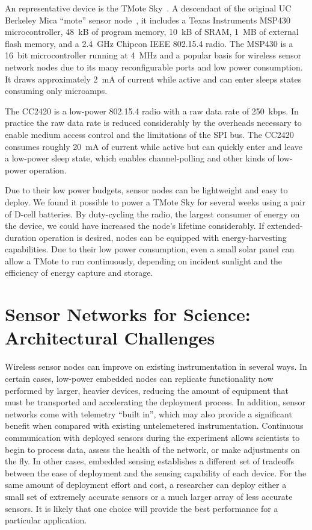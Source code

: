 An representative device is the TMote Sky~\cite{moteiv}. A descendant of the
original UC Berkeley Mica ``mote'' sensor node~\cite{hill-thesis}, it
includes a Texas Instruments MSP430 microcontroller, 48~kB of program memory,
10~kB of SRAM, 1~MB of external flash memory, and a 2.4~GHz Chipcon IEEE
802.15.4 radio. The MSP430 is a 16~bit microcontroller running at 4~MHz and a
popular basis for wireless sensor network nodes due to its many
reconfigurable ports and low power consumption. It draws approximately 2~mA
of current while active and can enter sleeps states consuming only microamps.

The CC2420 is a low-power 802.15.4 radio with a raw data rate of 250~kbps. In
practice the raw data rate is reduced considerably by the overheads necessary
to enable medium access control and the limitations of the SPI bus. The
CC2420 consumes roughly 20~mA of current while active but can quickly enter
and leave a low-power sleep state, which enables channel-polling and other
kinds of low-power operation.

Due to their low power budgets, sensor nodes can be lightweight and easy to
deploy. We found it possible to power a TMote Sky for several weeks using a
pair of D-cell batteries. By duty-cycling the radio, the largest consumer of
energy on the device, we could have increased the node's lifetime
considerably. If extended-duration operation is desired, nodes can be
equipped with energy-harvesting capabilities. Due to their low power
consumption, even a small solar panel can allow a TMote to run continuously,
depending on incident sunlight and the efficiency of energy capture and
storage.

\section{Sensor Networks for Science: Architectural Challenges}

Wireless sensor nodes can improve on existing instrumentation in several
ways. In certain cases, low-power embedded nodes can replicate functionality
now performed by larger, heavier devices, reducing the amount of equipment
that must be transported and accelerating the deployment process. In
addition, sensor networks come with telemetry ``built in'', which may also
provide a significant benefit when compared with existing untelemetered
instrumentation. Continuous communication with deployed sensors during the
experiment allows scientists to begin to process data, assess the health of
the network, or make adjustments on the fly. In other cases, embedded sensing
establishes a different set of tradeoffs between the ease of deployment and
the sensing capability of each device. For the same amount of deployment
effort and cost, a researcher can deploy either a small set of extremely
accurate sensors or a much larger array of less accurate sensors. It is
likely that one choice will provide the best performance for a particular
application.

